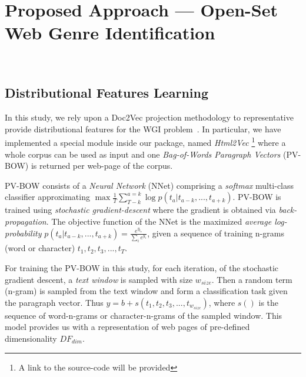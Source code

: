 \documentclass[runningheads]{llncs}
\begin{document}
\section{Proposed Approach --- Open-Set Web Genre Identification}~\label{sec:approach}
\subsection{Distributional Features Learning}\label{sec:Gensim}
In this study, we rely upon a Doc2Vec projection methodology to representative provide distributional features for the WGI problem~\cite{rehurek_lrec,mikolov2013efficient,mikolov2013distributed}. In particular, we have implemented a special module inside our package, named \textit{Html2Vec} \footnote{A link to the source-code will be provided}
where a whole corpus can be used as input and one \textit{Bag-of-Words Paragraph Vectors} (PV-BOW) is returned per web-page of the corpus.

PV-BOW consists of a \textit{Neural Network} (NNet) comprising a \textit{softmax} multi-class classifier approximating $ \max{\frac{1}{T} \sum^{a=k}_{T-k}{\log{p(t_{a}|t_{a-k},...,t_{a+k})}}}$. PV-BOW is trained using \textit{stochastic gradient-descent} where the gradient is obtained via  \textit{back-propagation}. The objective function of the NNet is the maximized \textit{average log-probability} $p(t_{a}|t_{a-k},...,t_{a+k}) = \frac{e^{y_{t_{a}}}}{\sum_{i}{e^{y_i}}}$, given a sequence of training n-grams (word or character) $t_{1}, t_{2}, t_{3}, ..., t_{T}$.

For training the PV-BOW in this study, for each iteration, of the stochastic gradient descent, a \textit{text window} is sampled with size $w_{size}$. Then a random term (n-gram) is sampled from the text window and form a classification task given the paragraph vector. Thus $y = b + s(t_{1},t_{2},t_{3},...,t_{w_{size}})$, where $s()$ is the sequence of word-n-grams or character-n-grams of the sampled window. This model provides us with a representation of web pages of pre-defined dimensionality $DF_{dim}$.

\end{document}
